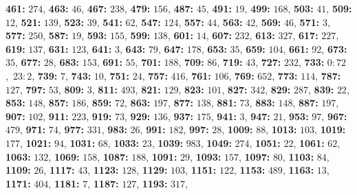 \textsf{\bfseries 461:} $274$, \textsf{\bfseries 463:} $46$, \textsf{\bfseries 467:} $238$, \textsf{\bfseries 479:} $156$, \textsf{\bfseries 487:} $45$, \textsf{\bfseries 491:} $19$, \textsf{\bfseries 499:} $168$, \textsf{\bfseries 503:} $41$, \textsf{\bfseries 509:} $12$, \textsf{\bfseries 521:} $139$, \textsf{\bfseries 523:} $39$, \textsf{\bfseries 541:} $62$, \textsf{\bfseries 547:} $124$, 
\textsf{\bfseries 557:} $44$, \textsf{\bfseries 563:} $42$, \textsf{\bfseries 569:} $46$, \textsf{\bfseries 571:} $3$, \textsf{\bfseries 577:} $250$, \textsf{\bfseries 587:} $19$, \textsf{\bfseries 593:} $155$, \textsf{\bfseries 599:} $138$, \textsf{\bfseries 601:} $14$, \textsf{\bfseries 607:} $232$, \textsf{\bfseries 613:} $327$, \textsf{\bfseries 617:} $227$, \textsf{\bfseries 619:} $137$, \textsf{\bfseries 631:} $123$, \textsf{\bfseries 641:} $3$, \textsf{\bfseries 643:} $79$, \textsf{\bfseries 647:} $178$, \textsf{\bfseries 653:} $35$, \textsf{\bfseries 659:} $104$, \textsf{\bfseries 661:} $92$, \textsf{\bfseries 673:} $35$, \textsf{\bfseries 677:} $28$, \textsf{\bfseries 683:} $153$, \textsf{\bfseries 691:} $55$, \textsf{\bfseries 701:} $188$, \textsf{\bfseries 709:} $86$, \textsf{\bfseries 719:} $43$, \textsf{\bfseries 727:} $232$, \textsf{\bfseries 733:} 0:\,$72$,\ 23:\,$2$, \textsf{\bfseries 739:} $7$, \textsf{\bfseries 743:} $10$, \textsf{\bfseries 751:} $24$, \textsf{\bfseries 757:} $416$, \textsf{\bfseries 761:} $106$, \textsf{\bfseries 769:} $652$, \textsf{\bfseries 773:} $114$, \textsf{\bfseries 787:} $127$, \textsf{\bfseries 797:} $53$, \textsf{\bfseries 809:} $3$, \textsf{\bfseries 811:} $493$, \textsf{\bfseries 821:} $129$, \textsf{\bfseries 823:} $101$, \textsf{\bfseries 827:} $342$, \textsf{\bfseries 829:} $287$, \textsf{\bfseries 839:} $22$, \textsf{\bfseries 853:} $148$, \textsf{\bfseries 857:} $186$, \textsf{\bfseries 859:} $72$, \textsf{\bfseries 863:} $197$, \textsf{\bfseries 877:} $138$, \textsf{\bfseries 881:} $73$, \textsf{\bfseries 883:} $148$, \textsf{\bfseries 887:} $197$, \textsf{\bfseries 907:} $102$, \textsf{\bfseries 911:} $223$, \textsf{\bfseries 919:} $73$, \textsf{\bfseries 929:} $136$, \textsf{\bfseries 937:} $175$, \textsf{\bfseries 941:} $3$, \textsf{\bfseries 947:} $21$, \textsf{\bfseries 953:} $97$, \textsf{\bfseries 967:} $479$, \textsf{\bfseries 971:} $74$, \textsf{\bfseries 977:} $331$, \textsf{\bfseries 983:} $26$, \textsf{\bfseries 991:} $182$, \textsf{\bfseries 997:} $28$, \textsf{\bfseries 1009:} $88$, \textsf{\bfseries 1013:} $103$, \textsf{\bfseries 1019:} $177$, \textsf{\bfseries 1021:} $94$, \textsf{\bfseries 1031:} $68$, \textsf{\bfseries 1033:} $23$, \textsf{\bfseries 1039:} $983$, \textsf{\bfseries 1049:} $274$, \textsf{\bfseries 1051:} $22$, \textsf{\bfseries 1061:} $62$, \textsf{\bfseries 1063:} $132$, \textsf{\bfseries 1069:} $158$, \textsf{\bfseries 1087:} $188$, \textsf{\bfseries 1091:} $29$, \textsf{\bfseries 1093:} $157$, \textsf{\bfseries 1097:} $80$, \textsf{\bfseries 1103:} $84$, \textsf{\bfseries 1109:} $26$, \textsf{\bfseries 1117:} $43$, \textsf{\bfseries 1123:} $128$, \textsf{\bfseries 1129:} $103$, \textsf{\bfseries 1151:} $122$, \textsf{\bfseries 1153:} $489$, \textsf{\bfseries 1163:} $13$, \textsf{\bfseries 1171:} $404$, \textsf{\bfseries 1181:} $7$, \textsf{\bfseries 1187:} $127$, \textsf{\bfseries 1193:} $317$, 